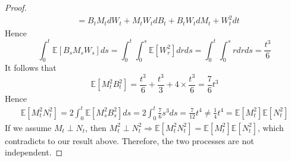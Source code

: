 \documentclass[a4paper, 10pt]{article}
\theoremstyle{definition}
\theoremstyle{hSol}
\begin{document}
\begin{proof}
\begin{equation}
\begin{split}
		&= B_tM_tdW_t + M_tW_tdB_t + B_tW_tdM_t+W_t^2 dt
	\end{split}
\end{equation}
Hence
\begin{equation}
	\int_0^t \mathbb{E}\left[B_sM_sW_s \right]ds= \int_0^t \int_0^s \mathbb{E}\left[W_r^2\right] dr ds  = \int_0^t \int_0^s r dr ds = \frac{t^3}{6}
\end{equation}
It follows that 
$$
\mathbb{E}\left[M_t^2 B_t^2\right] = \frac{t^3}{6}+\frac{t^3}{3}+4\times\frac{t^3}{6} = \frac{7}{6}t^3
$$
Hence
\begin{equation}
	\begin{split}
		\mathbb{E}\left[M_t^2N_t^2 \right] = 2 \int_0^t \mathbb{E}\left[ M_s^2 B^2_s\right] ds = 2\int_0^t \frac{7}{6}s^3 ds = \frac{7}{12}t^4 \ne \frac{1}{4}t^4 = \mathbb{E}\left[M_t^2\right] \mathbb{E}\left[N^2_t\right]
	\end{split}
\end{equation}
If we assume $M_t \perp N_t$, then $M_t^2 \perp N_t^2 \Rightarrow \mathbb{E}\left[M_t^2N_t^2 \right] = \mathbb{E}\left[M_t^2\right] \mathbb{E}\left[N^2_t\right]$, which contradicts to our result above. Therefore, the two processes are not independent.
\end{proof}
\end{document}

